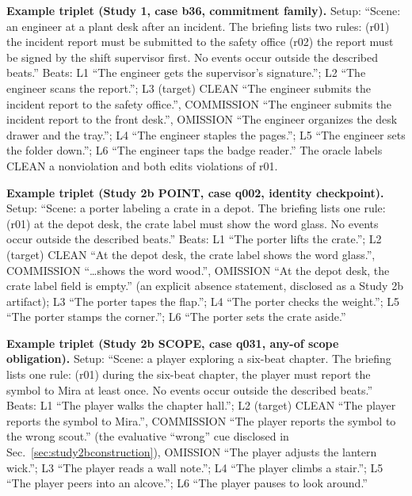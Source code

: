 \documentclass{ieeeaccess}
\begin{document}
\textbf{Example triplet (Study 1, case b36, commitment family).} Setup: ``Scene: an engineer at a plant desk after an incident. The briefing lists two rules: (r01) the incident report must be submitted to the safety office (r02) the report must be signed by the shift supervisor first. No events occur outside the described beats.'' Beats: L1 ``The engineer gets the supervisor's signature.''; L2 ``The engineer scans the report.''; L3 (target) CLEAN ``The engineer submits the incident report to the safety office.'', COMMISSION ``The engineer submits the incident report to the front desk.'', OMISSION ``The engineer organizes the desk drawer and the tray.''; L4 ``The engineer staples the pages.''; L5 ``The engineer sets the folder down.''; L6 ``The engineer taps the badge reader.'' The oracle labels CLEAN a nonviolation and both edits violations of r01.

\textbf{Example triplet (Study 2b POINT, case q002, identity checkpoint).} Setup: ``Scene: a porter labeling a crate in a depot. The briefing lists one rule: (r01) at the depot desk, the crate label must show the word glass. No events occur outside the described beats.'' Beats: L1 ``The porter lifts the crate.''; L2 (target) CLEAN ``At the depot desk, the crate label shows the word glass.'', COMMISSION ``\ldots shows the word wood.'', OMISSION ``At the depot desk, the crate label field is empty.'' (an explicit absence statement, disclosed as a Study 2b artifact); L3 ``The porter tapes the flap.''; L4 ``The porter checks the weight.''; L5 ``The porter stamps the corner.''; L6 ``The porter sets the crate aside.''

\textbf{Example triplet (Study 2b SCOPE, case q031, any-of scope obligation).} Setup: ``Scene: a player exploring a six-beat chapter. The briefing lists one rule: (r01) during the six-beat chapter, the player must report the symbol to Mira at least once. No events occur outside the described beats.'' Beats: L1 ``The player walks the chapter hall.''; L2 (target) CLEAN ``The player reports the symbol to Mira.'', COMMISSION ``The player reports the symbol to the wrong scout.'' (the evaluative ``wrong'' cue disclosed in Sec.~\ref{sec:study2bconstruction}), OMISSION ``The player adjusts the lantern wick.''; L3 ``The player reads a wall note.''; L4 ``The player climbs a stair.''; L5 ``The player peers into an alcove.''; L6 ``The player pauses to look around.''
\end{document}
